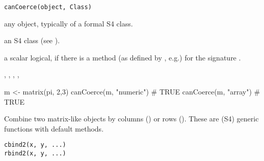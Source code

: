 %
\begin{Usage}
\begin{verbatim}
canCoerce(object, Class)
\end{verbatim}
\end{Usage}
%
\begin{Arguments}
\begin{ldescription}
\item[\code{object}] any \R{} object, typically of a formal S4 class.
\item[\code{Class}] an S4 class (see ).
\end{ldescription}
\end{Arguments}
%
\begin{Value}
a scalar logical,  if there is a  method
(as defined by , e.g.) for the signature
.
\end{Value}
%
\begin{SeeAlso}\relax
{}, ,
, ,
\end{SeeAlso}
%
\begin{Examples}
\begin{ExampleCode}
m <- matrix(pi, 2,3)
canCoerce(m, "numeric") # TRUE
canCoerce(m, "array")   # TRUE
\end{ExampleCode}
\end{Examples}
%
\begin{Description}\relax
Combine two matrix-like \R{} objects by columns ()
or rows (). These are (S4) generic functions with default
methods.
\end{Description}
%
\begin{Usage}
\begin{verbatim}
cbind2(x, y, ...)
rbind2(x, y, ...)
\end{verbatim}
\end{Usage}
